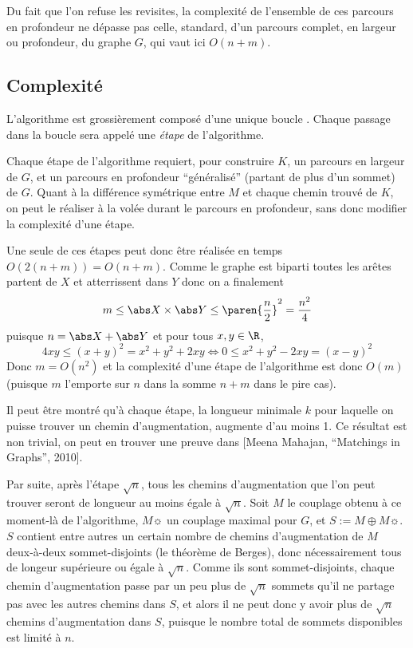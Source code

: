  Du fait que l'on refuse les revisites, la complexité de l'ensemble de ces parcours en profondeur ne dépasse pas celle, standard, d'un parcours complet, en largeur ou profondeur, du graphe $G$, qui vaut ici $O(n + m)$.
 
 \subsection{Complexité}
 
 L'algorithme est grossièrement composé d'une unique boucle . Chaque passage dans la boucle sera appelé une \emph{étape} de l'algorithme.
 
 Chaque étape de l'algorithme requiert, pour construire $K$, un parcours en largeur de $G$, et un parcours en profondeur ``généralisé'' (partant de plus d'un sommet) de $G$. Quant à la différence symétrique entre $M$ et chaque chemin trouvé de $K$, on peut le réaliser à la volée durant le parcours en profondeur, sans donc modifier la complexité d'une étape.
 
 Une seule de ces étapes peut donc être réalisée en temps $O(2(n+m)) = O(n + m)$. Comme le graphe est biparti toutes les arêtes partent de $X$ et atterrissent dans $Y$ donc on a finalement
 \[ m \leq \abs X \times \abs Y \leq \paren{\dfrac n 2}^2 = \dfrac {n^2} 4 \]
 puisque $n = \abs X + \abs Y$ et pour tous $x,y \in \R$,
 \[4xy \leq (x + y)^2 = x^2 + y^2 + 2xy  \iff 0 \leq x^2 + y^2 - 2xy = (x - y)^2\]
 Donc $m = O(n^2)$ et la complexité d'une étape de l'algorithme est donc $O(m)$ (puisque $m$ l'emporte sur $n$ dans la somme $n + m$ dans le pire cas).
 
 Il peut être montré qu'à chaque étape, la longueur minimale $k$ pour laquelle on puisse trouver un chemin d'augmentation, augmente d'au moins 1. Ce résultat est non trivial, on peut en trouver une preuve dans [Meena Mahajan, ``Matchings in Graphs'', 2010].
 
 Par suite, après l'étape $\sqrt n$, tous les chemins d'augmentation que l'on peut trouver seront de longueur au moins égale à $\sqrt n$. Soit $M$ le couplage obtenu à ce moment-là de l'algorithme, $M\sun$ un couplage maximal pour $G$, et $S := M \oplus M\sun$. $S$ contient entre autres un certain nombre de chemins d'augmentation de $M$ deux-à-deux sommet-disjoints (\cf le théorème de Berges), donc nécessairement tous de longeur supérieure ou égale à $\sqrt n$. Comme ils sont sommet-disjoints, chaque chemin d'augmentation passe par un peu plus de $\sqrt n$ sommets qu'il ne partage pas avec les autres chemins dans $S$, et alors il ne peut donc y avoir plus de $\sqrt n$ chemins d'augmentation dans $S$, puisque le nombre total de sommets disponibles est limité à $n$.
 
